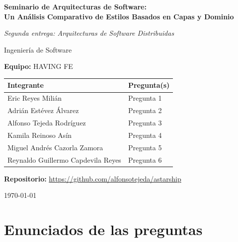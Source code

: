 \documentclass[12pt,a4paper]{article}
\begin{document}
\begin{titlepage}
  \centering
  {\Large \textbf{Seminario de Arquitecturas de Software:\\
  Un Análisis Comparativo de Estilos Basados en Capas y Dominio}\par}
  \vspace{0.6cm}
  {\large \emph{Segunda entrega: Arquitecturas de Software Distribuidas}\par}
  \vspace{1.5cm}
  {\large Ingeniería de Software\par}
  \vspace{1cm}
  {\large \textbf{Equipo:} HAVING FE\par}
  \vspace{1.5cm}

  \begin{tabular}{p{7cm}p{6cm}}
    \hline
    \textbf{Integrante} & \textbf{Pregunta(s)} \\
    \hline
    Eric Reyes Milián & Pregunta 1 \\
    Adrián Estévez Álvarez & Pregunta 2 \\
    Alfonso Tejeda Rodríguez & Pregunta 3 \\
    Kamila Reinoso Asín & Pregunta 4 \\
    Miguel Andrés Cazorla Zamora & Pregunta 5 \\
    Reynaldo Guillermo Capdevila Reyes & Pregunta 6 \\
    \hline
  \end{tabular}

  \vspace{1.5cm}
  \textbf{Repositorio:} \url{https://github.com/alfonsotejeda/astarship}
  \vfill
  {\large \today\par}
\end{titlepage}

\tableofcontents
\newpage

\section*{Enunciados de las preguntas}
\end{document}
